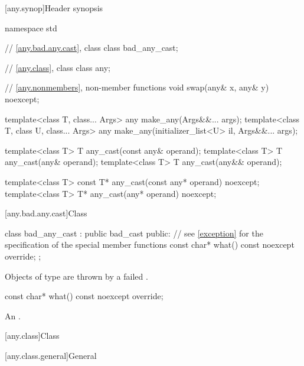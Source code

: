 [any.synop]{Header  synopsis}

%

\begin{codeblock}
namespace std {
  // \ref{any.bad.any.cast}, class 
  class bad_any_cast;

  // \ref{any.class}, class 
  class any;

  // \ref{any.nonmembers}, non-member functions
  void swap(any& x, any& y) noexcept;

  template<class T, class... Args>
    any make_any(Args&&... args);
  template<class T, class U, class... Args>
    any make_any(initializer_list<U> il, Args&&... args);

  template<class T>
    T any_cast(const any& operand);
  template<class T>
    T any_cast(any& operand);
  template<class T>
    T any_cast(any&& operand);

  template<class T>
    const T* any_cast(const any* operand) noexcept;
  template<class T>
    T* any_cast(any* operand) noexcept;
}
\end{codeblock}

[any.bad.any.cast]{Class }

%
\begin{codeblock}
class bad_any_cast : public bad_cast {
public:
  // see \ref{exception} for the specification of the special member functions
  const char* what() const noexcept override;
};
\end{codeblock}

\pnum
Objects of type  are thrown by a failed .

%
\begin{itemdecl}
const char* what() const noexcept override;
\end{itemdecl}

\begin{itemdescr}
\pnum
\returns
An  \ntbs{}.
\end{itemdescr}

[any.class]{Class }

[any.class.general]{General}

